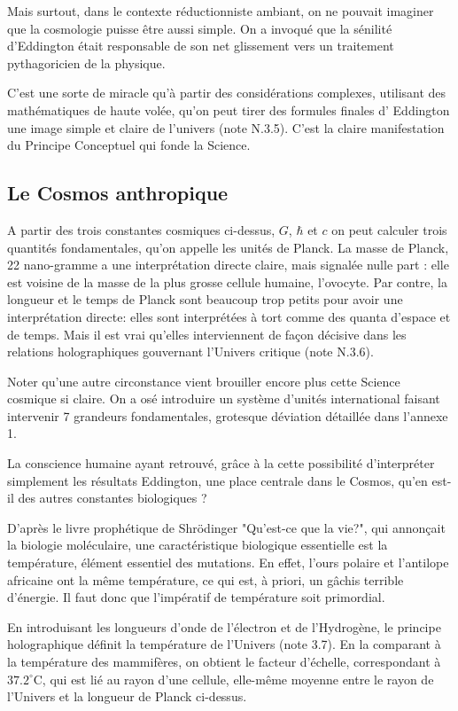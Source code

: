 \documentclass[a4paper,12pt]{article}
\begin{document}
Mais surtout, dans le contexte réductionniste ambiant, on ne pouvait imaginer que la cosmologie puisse être aussi simple. On a invoqué que la sénilité d'Eddington était responsable de son net glissement vers un traitement pythagoricien de la physique.

C’est une sorte de miracle qu’à partir des considérations complexes, utilisant des mathématiques de haute volée, qu’on peut tirer des formules finales d’ Eddington une image simple et claire de l’univers (note N.3.5). C’est la claire manifestation du Principe Conceptuel qui fonde la Science.



\subsection{Le Cosmos anthropique}

A partir des trois constantes cosmiques ci-dessus, $G$, $\hbar$ et $c$ on peut calculer trois quantités fondamentales, qu'on appelle les unités de Planck. La masse de Planck, 22 nano-gramme a une interprétation directe claire, mais signalée nulle part : elle est voisine de la masse de la plus grosse cellule humaine, l'ovocyte. Par contre, la longueur et le temps de Planck sont beaucoup trop petits pour avoir une interprétation directe: elles sont interprétées à tort comme des quanta d'espace et de temps. Mais il est vrai qu'elles interviennent de façon décisive dans les relations holographiques gouvernant l'Univers critique (note N.3.6). 

Noter qu'une autre circonstance vient brouiller encore plus cette Science cosmique si claire. On a osé introduire un système d'unités international faisant intervenir 7 grandeurs fondamentales, grotesque déviation détaillée dans l'annexe 1. 

La conscience humaine ayant retrouvé, grâce à la cette possibilité d’interpréter simplement les résultats Eddington, une place centrale dans le Cosmos, qu'en est-il des autres constantes biologiques ?

D'après le livre prophétique de Shrödinger "Qu'est-ce que la vie?", qui annonçait la biologie moléculaire, une caractéristique biologique essentielle est la température, élément essentiel des mutations. En effet, l'ours polaire et l'antilope africaine ont la même température, ce qui est, à priori, un gâchis terrible d'énergie. Il faut donc que l'impératif de température soit primordial.

En introduisant les longueurs d'onde de l'électron et de l'Hydrogène, le principe holographique définit la température de l'Univers (note 3.7). En la comparant à la température des mammifères, on obtient le facteur d'échelle, correspondant à $37.2^{\circ}$C, qui est lié au rayon d'une cellule, elle-même moyenne entre le rayon de l'Univers et la longueur de Planck ci-dessus. 
\end{document}
